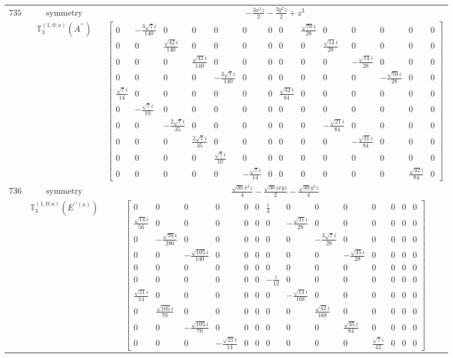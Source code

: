 \documentclass[fleqn,8pt,landscape]{jsarticle}
\begin{document}
\begin{longtable}{ccc}
$ 735 $ & $ \text{symmetry} $ & $ - \frac{3 x^{2} z}{2} - \frac{3 y^{2} z}{2} + z^{3} $ \\
$  $ & $ \mathbb{T}_{3}^{(1,0;a)}(A^{\prime\prime}) $ & $ \begin{bmatrix} 0 & - \frac{3 \sqrt{7} i}{140} & 0 & 0 & 0 & 0 & 0 & 0 & \frac{\sqrt{70} i}{28} & 0 & 0 & 0 & 0 & 0 \\ 0 & 0 & \frac{\sqrt{42} i}{140} & 0 & 0 & 0 & 0 & 0 & 0 & \frac{\sqrt{14} i}{28} & 0 & 0 & 0 & 0 \\ 0 & 0 & 0 & \frac{\sqrt{42} i}{140} & 0 & 0 & 0 & 0 & 0 & 0 & - \frac{\sqrt{14} i}{28} & 0 & 0 & 0 \\ 0 & 0 & 0 & 0 & - \frac{3 \sqrt{7} i}{140} & 0 & 0 & 0 & 0 & 0 & 0 & - \frac{\sqrt{70} i}{28} & 0 & 0 \\ \frac{\sqrt{7} i}{14} & 0 & 0 & 0 & 0 & 0 & 0 & \frac{\sqrt{42} i}{84} & 0 & 0 & 0 & 0 & 0 & 0 \\ 0 & - \frac{\sqrt{7} i}{10} & 0 & 0 & 0 & 0 & 0 & 0 & 0 & 0 & 0 & 0 & 0 & 0 \\ 0 & 0 & - \frac{2 \sqrt{7} i}{35} & 0 & 0 & 0 & 0 & 0 & 0 & - \frac{\sqrt{21} i}{84} & 0 & 0 & 0 & 0 \\ 0 & 0 & 0 & \frac{2 \sqrt{7} i}{35} & 0 & 0 & 0 & 0 & 0 & 0 & - \frac{\sqrt{21} i}{84} & 0 & 0 & 0 \\ 0 & 0 & 0 & 0 & \frac{\sqrt{7} i}{10} & 0 & 0 & 0 & 0 & 0 & 0 & 0 & 0 & 0 \\ 0 & 0 & 0 & 0 & 0 & - \frac{\sqrt{7} i}{14} & 0 & 0 & 0 & 0 & 0 & 0 & \frac{\sqrt{42} i}{84} & 0 \end{bmatrix} $ \\ \hline
$ 736 $ & $ \text{symmetry} $ & $ \frac{\sqrt{30} x^{2} z}{4} - \frac{\sqrt{30} i x y z}{2} - \frac{\sqrt{30} y^{2} z}{4} $ \\
$  $ & $ \mathbb{T}_{3}^{(1,0;a)}(E^{\prime\prime(a)}) $ & $ \begin{bmatrix} 0 & 0 & 0 & 0 & 0 & 0 & \frac{i}{4} & 0 & 0 & 0 & 0 & 0 & 0 & 0 \\ \frac{\sqrt{14} i}{56} & 0 & 0 & 0 & 0 & 0 & 0 & - \frac{\sqrt{21} i}{28} & 0 & 0 & 0 & 0 & 0 & 0 \\ 0 & - \frac{\sqrt{70} i}{280} & 0 & 0 & 0 & 0 & 0 & 0 & - \frac{3 \sqrt{7} i}{28} & 0 & 0 & 0 & 0 & 0 \\ 0 & 0 & - \frac{\sqrt{105} i}{140} & 0 & 0 & 0 & 0 & 0 & 0 & - \frac{\sqrt{35} i}{28} & 0 & 0 & 0 & 0 \\ 0 & 0 & 0 & 0 & 0 & 0 & 0 & 0 & 0 & 0 & 0 & 0 & 0 & 0 \\ 0 & 0 & 0 & 0 & 0 & 0 & - \frac{i}{12} & 0 & 0 & 0 & 0 & 0 & 0 & 0 \\ \frac{\sqrt{21} i}{14} & 0 & 0 & 0 & 0 & 0 & 0 & - \frac{\sqrt{14} i}{168} & 0 & 0 & 0 & 0 & 0 & 0 \\ 0 & \frac{\sqrt{105} i}{70} & 0 & 0 & 0 & 0 & 0 & 0 & \frac{\sqrt{42} i}{168} & 0 & 0 & 0 & 0 & 0 \\ 0 & 0 & - \frac{\sqrt{105} i}{70} & 0 & 0 & 0 & 0 & 0 & 0 & \frac{\sqrt{35} i}{84} & 0 & 0 & 0 & 0 \\ 0 & 0 & 0 & - \frac{\sqrt{21} i}{14} & 0 & 0 & 0 & 0 & 0 & 0 & \frac{\sqrt{7} i}{42} & 0 & 0 & 0 \end{bmatrix} $ \\ \hline

\end{longtable}
\end{document}

